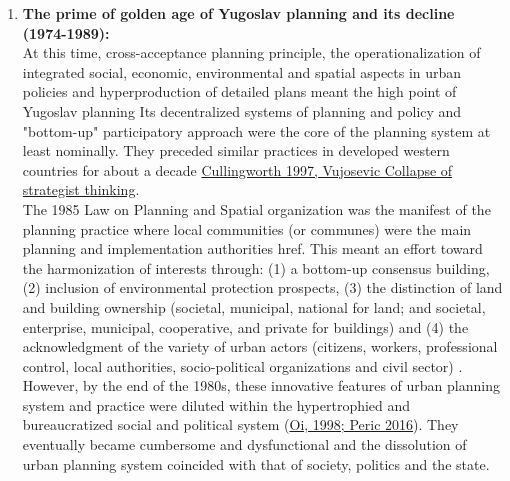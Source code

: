 \documentclass[11pt]{report}
\begin{document}
\begin{enumerate}
The decentralizing political and economic measures\footnote{Strengthening the role of the Federal units and semi-market economic system} contributed to the introduction of integrated and comprehensive planning in Yugoslav context. Its main achievements are:
(1) the administrative hierarchy  and the distribution of plans,
(2) interdisciplinary planning practice,
(3) increased public participation, and
(4) social approach through the mass provision of affordable housing \href{}{\citealt{Vesna Cagic 2014, Peric 2016}}. This model was introduced as the ‘Basic Policy on Urbanism and Spatial Ordering’ and passed by the State Parliament in 1971 \href{ref}{\citealt{nedovicbudic_waves_2006}}.
Namely, Yugoslav planning system was internationally acknowledged as significantly decentralized and multidisciplinary with strong tendencies to include and balance spatial, social, economic, and environmental principles (\href{ref}{\citealt{simmie_self-management_1989}}; \href{ref}{\citealt{Miodrag Vujosevic, 2003}}, \href{ref}{\citealt{peric_evolution_2016}}).

\item \textbf{The prime of golden age of Yugoslav planning and its decline (1974-1989):}
\\
At this time, cross-acceptance planning principle, the operationalization of integrated social, economic, environmental and spatial aspects in urban policies and hyperproduction of detailed plans meant the high point of Yugoslav planning \href{ref}{\cite{Mornings after Nedovic Budic}}
Its decentralized systems of planning and policy and "bottom-up" participatory approach were the core of the planning system at least nominally. They preceded similar practices in developed western countries for about a decade \href{ref}{Cullingworth 1997, Vujosevic Collapse of strategist thinking}.
\\

The 1985 Law on Planning and Spatial organization was the manifest of the planning practice where local communities (or communes) were the main planning and implementation authorities href{}{\citealt{vujosevic_planning_2006}}. This meant an effort toward the harmonization of interests through:
(1) a bottom-up consensus building,
(2) inclusion of environmental protection prospects,
(3) the distinction of land and building ownership (societal, municipal, national for land; and societal, enterprise, municipal, cooperative, and private for buildings) and
(4) the acknowledgment of the variety of urban actors (citizens, workers, professional control, local authorities, socio-political organizations and civil sector) \cite{adjustment of planning practice nedovic budic 2001}.
However, by the end of the 1980s, these innovative features of urban planning system and practice were diluted within the hypertrophied and bureaucratized social and political system (\href{ref}{Oi, 1998; Peric 2016}). They eventually became cumbersome and dysfunctional and the dissolution of urban planning system coincided with that of society, politics and the state.
\end{enumerate}
\end{document}
